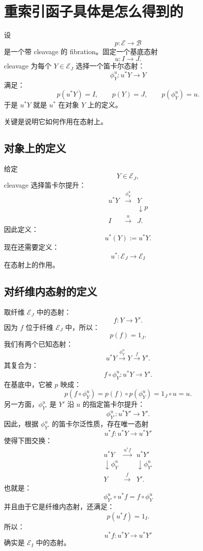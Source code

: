 \documentclass[12pt,a4paper]{article}
\begin{document}
\newpage

\section{重索引函子具体是怎么得到的}

设
\[
p:\mathcal{E}\to\mathcal{B}
\]
是一个带 cleavage 的 fibration。固定一个基底态射
\[
u:I\to J.
\]
cleavage 为每个 \(Y\in\mathcal{E}_J\) 选择一个笛卡尔态射：
\[
\phi_Y^u:u^*Y\longrightarrow Y
\]
满足：
\[
p(u^*Y)=I,\qquad p(Y)=J,\qquad p(\phi_Y^u)=u.
\]
于是 \(u^*Y\) 就是 \(u^*\) 在对象 \(Y\) 上的定义。

关键是说明它如何作用在态射上。

\subsection{对象上的定义}

给定
\[
Y\in\mathcal{E}_J,
\]
cleavage 选择笛卡尔提升：
\[
\begin{array}{ccc}
u^*Y&\xrightarrow{\phi_Y^u}&Y\\
&&\downarrow p\\
I&\xrightarrow{u}&J.
\end{array}
\]
因此定义：
\[
u^*(Y):=u^*Y.
\]
现在还需要定义：
\[
u^*:\mathcal{E}_J\to\mathcal{E}_I
\]
在态射上的作用。

\subsection{对纤维内态射的定义}

取纤维 \(\mathcal{E}_J\) 中的态射：
\[
f:Y\to Y'.
\]
因为 \(f\) 位于纤维 \(\mathcal{E}_J\) 中，所以：
\[
p(f)=1_J.
\]
我们有两个已知态射：
\[
u^*Y\xrightarrow{\phi_Y^u}Y
\xrightarrow{f}Y'.
\]
其复合为：
\[
f\circ\phi_Y^u:u^*Y\to Y'.
\]
在基底中，它被 \(p\) 映成：
\[
p(f\circ\phi_Y^u)
=
p(f)\circ p(\phi_Y^u)
=
1_J\circ u
=
u.
\]
另一方面，\(\phi_{Y'}^u\) 是 \(Y'\) 沿 \(u\) 的指定笛卡尔提升：
\[
\phi_{Y'}^u:u^*Y'\to Y'.
\]
因此，根据 \(\phi_{Y'}^u\) 的笛卡尔泛性质，存在唯一态射
\[
u^*f:u^*Y\to u^*Y'
\]
使得下图交换：
\[
\begin{array}{ccc}
u^*Y & \xrightarrow{u^*f} & u^*Y'\\
\downarrow{\phi_Y^u} && \downarrow{\phi_{Y'}^u}\\
Y & \xrightarrow{f} & Y'.
\end{array}
\]
也就是：
\[
\boxed{
\phi_{Y'}^u\circ u^*f
=
f\circ\phi_Y^u
}
\]
并且由于它是纤维内态射，还满足：
\[
p(u^*f)=1_I.
\]
所以：
\[
u^*f:u^*Y\to u^*Y'
\]
确实是 \(\mathcal{E}_I\) 中的态射。
\end{document}
